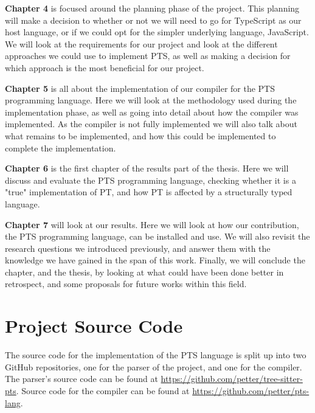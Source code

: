 \textbf{Chapter 4} is focused around the planning phase of the project.
This planning will make a decision to whether or not we will need to go for TypeScript as our host language, or if we could opt for the simpler underlying language, JavaScript.
We will look at the requirements for our project and look at the different approaches we could use to implement PTS, as well as making a decision for which approach is the most beneficial for our project.

\textbf{Chapter 5} is all about the implementation of our compiler for the PTS programming language.
Here we will look at the methodology used during the implementation phase, as well as going into detail about how the compiler was implemented.
As the compiler is not fully implemented we will also talk about what remains to be implemented, and how this could be implemented to complete the implementation.

\textbf{Chapter 6} is the first chapter of the results part of the thesis.
Here we will discuss and evaluate the PTS programming language, checking whether it is a "true" implementation of PT, and how PT is affected by a structurally typed language.

\textbf{Chapter 7} will look at our results.
Here we will look at how our contribution, the PTS programming language, can be installed and use.
We will also revisit the research questions we introduced previously, and answer them with the knowledge we have gained in the span of this work.
Finally, we will conclude the chapter, and the thesis, by looking at what could have been done better in retrospect, and some proposals for future works within this field.

\section{Project Source Code}\label{sec:project-source-code}

The source code for the implementation of the PTS language is split up into two GitHub repositories, one for the parser of the project, and one for the compiler.
The parser's source code can be found at \url{https://github.com/petter/tree-sitter-pts}.
Source code for the compiler can be found at \url{https://github.com/petter/pts-lang}.
